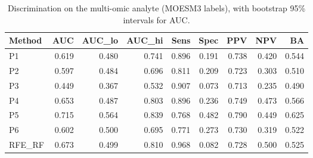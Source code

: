 \begin{table}[t]
\centering
\caption{Discrimination on the multi-omic analyte (MOESM3 labels), with bootstrap 95\% intervals for AUC.}
\begin{tabular}{lrrrrrrrr}
\hline
Method & AUC & AUC\_lo & AUC\_hi & Sens & Spec & PPV & NPV & BA \\
\hline
P1 & 0.619 & 0.480 & 0.741 & 0.896 & 0.191 & 0.738 & 0.420 & 0.544 \\
P2 & 0.597 & 0.484 & 0.696 & 0.811 & 0.209 & 0.723 & 0.303 & 0.510 \\
P3 & 0.449 & 0.367 & 0.532 & 0.907 & 0.073 & 0.713 & 0.235 & 0.490 \\
P4 & 0.653 & 0.487 & 0.803 & 0.896 & 0.236 & 0.749 & 0.473 & 0.566 \\
P5 & 0.715 & 0.564 & 0.839 & 0.768 & 0.482 & 0.790 & 0.449 & 0.625 \\
P6 & 0.602 & 0.500 & 0.695 & 0.771 & 0.273 & 0.730 & 0.319 & 0.522 \\
RFE\_RF & 0.673 & 0.499 & 0.810 & 0.968 & 0.082 & 0.728 & 0.500 & 0.525 \\
\hline
\end{tabular}
\end{table}
